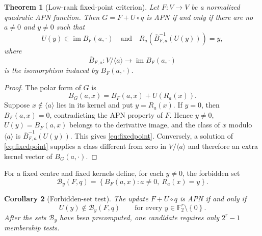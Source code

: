 \documentclass[pdflatex,sn-mathphys-num]{sn-jnl}
\theoremstyle{thmstyleone}
\newtheorem{theorem}{Theorem}[section]
\newtheorem{corollary}[theorem]{Corollary}
\theoremstyle{thmstyletwo}
\theoremstyle{thmstylethree}
\newcommand{\F}{\mathbb F}
\newcommand{\im}{\operatorname{im}}
\newcommand{\cB}{\mathcal B}
\newcommand{\set}[1]{\left\{#1\right\}}
\begin{document}
\begin{theorem}[Low-rank fixed-point criterion]\label{thm:lowrank}
Let $F:V\to V$ be a normalized quadratic APN function.  Then $G=F+U\circ q$ is APN if and only if there are no $a\ne0$ and $y\ne0$ such that
\begin{equation}\label{eq:fixedpoint}
 U(y)\in\im B_F(a,\cdot)
 \quad\text{and}\quad
 R_a\!\left(\overline B_{F,a}^{-1}(U(y))\right)=y,
\end{equation}
where
\[
 \overline B_{F,a}:V/\langle a\rangle\longrightarrow\im B_F(a,\cdot)
\]
is the isomorphism induced by $B_F(a,\cdot)$.
\end{theorem}

\begin{proof}
The polar form of $G$ is
\[
 B_G(a,x)=B_F(a,x)+U(R_a(x)).
\]
Suppose $x\notin\langle a\rangle$ lies in its kernel and put $y=R_a(x)$.  If $y=0$, then $B_F(a,x)=0$, contradicting the APN property of $F$.  Hence $y\ne0$, $U(y)=B_F(a,x)$ belongs to the derivative image, and the class of $x$ modulo $\langle a\rangle$ is $\overline B_{F,a}^{-1}(U(y))$.  This gives \eqref{eq:fixedpoint}.  Conversely, a solution of \eqref{eq:fixedpoint} supplies a class different from zero in $V/\langle a\rangle$ and therefore an extra kernel vector of $B_G(a,\cdot)$.
\end{proof}

For a fixed centre and fixed kernels define, for each $y\ne0$, the forbidden set
\begin{equation}\label{eq:forbidden}
 \cB_y(F,q)=\set{B_F(a,x):a\ne0,\ R_a(x)=y}.
\end{equation}

\begin{corollary}[Forbidden-set test]\label{cor:forbidden}
The update $F+U\circ q$ is APN if and only if
\[
 U(y)\notin\cB_y(F,q)
 \qquad\text{for every }y\in\F_2^r\setminus\set0.
\]
After the sets $\cB_y$ have been precomputed, one candidate requires only $2^r-1$ membership tests.
\end{corollary}
\end{document}
